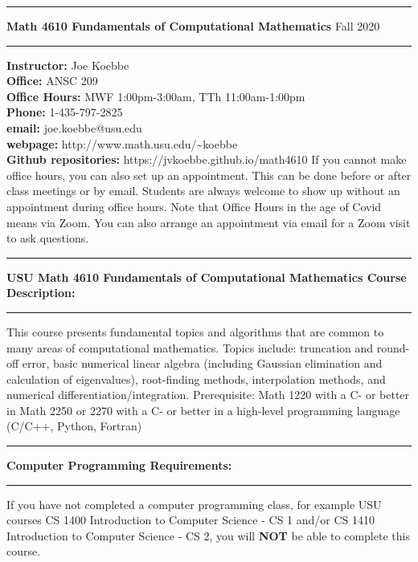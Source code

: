\documentclass[10pt,fleqn]{article}
\begin{document}
%
\pagestyle{empty}
\vskip0.1in\hrule\vskip0.1in \noindent
{\bf
   Math 4610 Fundamentals of Computational Mathematics
} \hfill Fall 2020
\vskip0.1in\hrule\vskip0.1in
\noindent
{\bf Instructor:} \hfill   Joe Koebbe \\
\smallskip\noindent
{\bf Office:}     \hfill   ANSC 209 \\
\smallskip\noindent
{\bf Office Hours:} \hfill MWF 1:00pm-3:00am, TTh 11:00am-1:00pm \\
\smallskip\noindent
{\bf Phone:}      \hfill   1-435-797-2825 \\
\smallskip\noindent
{\bf email:}      \hfill   joe.koebbe@usu.edu \\
\smallskip\noindent
{\bf webpage:}    \hfill   http://www.math.usu.edu/\~{}koebbe \\
\smallskip\noindent
{\bf Github repositories:}    \hfill   https://jvkoebbe.github.io/math4610
\smallskip\noindent
If you cannot make office hours, you can also set up an appointment. This can be
done before or after class meetings or by email. Students are always welcome to
show up without an appointment during office hours. Note that Office Hours in
the age of Covid means via Zoom. You can also arrange an appointment via email
for a Zoom visit to ask questions.
\vskip0.1in\hrule\vskip0.1in
\noindent
{\bf USU Math 4610 Fundamentals of Computational Mathematics Course
     Description:}
\vskip0.1in\hrule\vskip0.1in
\noindent
This course presents fundamental topics and algorithms that are common to many
areas of computational mathematics. Topics include: truncation and round-off
error, basic numerical linear algebra (including Gaussian elimination and
calculation of eigenvalues), root-finding methods, interpolation methods, and
numerical differentiation/integration. Prerequisite: Math 1220 with a C- or
better in Math 2250 or 2270 with a C- or better in a high-level programming
language (C/C++, Python, Fortran) 
\vskip0.1in\hrule\vskip0.1in
\noindent
{\bf Computer Programming Requirements:}
\vskip0.1in\hrule\vskip0.1in
\noindent
If you have not completed a computer programming class, for example USU courses
CS 1400 Introduction to Computer Science - CS 1 and/or CS 1410 Introduction to
Computer Science - CS 2, you will {\bf NOT} be able to complete this course.
\end{document}
